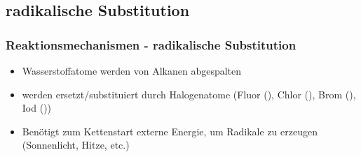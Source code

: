 \subsection{radikalische Substitution}
\begin{frame}
\frametitle{Reaktionsmechanismen - radikalische Substitution}
\begin{itemize}
	\item<+-> Wasserstoffatome werden von Alkanen abgespalten
	\item<+-> werden ersetzt/substituiert durch Halogenatome (Fluor (), Chlor (), Brom (), Iod ())
	\item<+-> Benötigt zum Kettenstart externe Energie, um Radikale zu erzeugen (Sonnenlicht, Hitze, etc.)
\end{itemize}
\end{frame}
